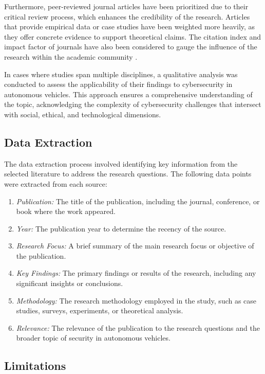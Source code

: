 Furthermore, peer-reviewed journal articles have been prioritized due to their critical review process, which enhances the credibility of the research.
Articles that provide empirical data or case studies have been weighted more heavily, as they offer concrete evidence to support theoretical claims.
The citation index and impact factor of journals have also been considered to gauge the influence of the research within the academic community  .

In cases where studies span multiple disciplines, a qualitative analysis was conducted to assess the applicability of their findings to cybersecurity in autonomous vehicles.
This approach ensures a comprehensive understanding of the topic, acknowledging the complexity of cybersecurity challenges that intersect with social, ethical, and technological dimensions.


\subsection{Data Extraction}\label{subsec:data-extraction}

The data extraction process involved identifying key information from the selected literature to address the research questions.
The following data points were extracted from each source:
\begin{enumerate}
    \item \textit{Publication:} The title of the publication, including the journal, conference, or book where the work appeared.
    \item \textit{Year:} The publication year to determine the recency of the source.
    \item \textit{Research Focus:} A brief summary of the main research focus or objective of the publication.
    \item \textit{Key Findings:} The primary findings or results of the research, including any significant insights or conclusions.
    \item \textit{Methodology:} The research methodology employed in the study, such as case studies, surveys, experiments, or theoretical analysis.
    \item \textit{Relevance:} The relevance of the publication to the research questions and the broader topic of security in autonomous vehicles.
\end{enumerate}

\subsection{Limitations}\label{subsec:limitations}

